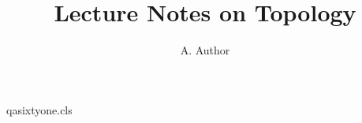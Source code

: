 \begin{filecontents*}[overwrite]{qasixtyone.cls}
\newcommand\course[1]{\gdef\@course{#1}}
\renewcommand\@maketitle{\begin{center}{\LARGE \@title \par}
  {\large Course: \@course \par}{\large \@author \par}\end{center}\par}
\end{filecontents*}
\documentclass{qasixtyone}
\title{Lecture Notes on Topology}
\author{A. Author}

\maketitle
Text.

